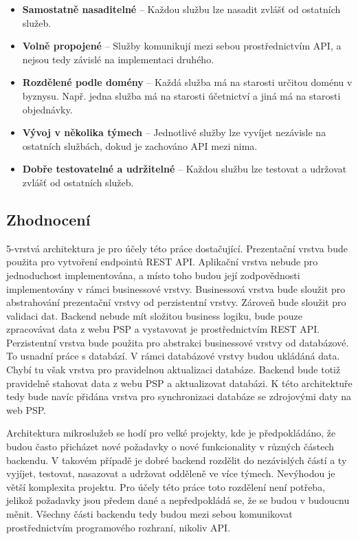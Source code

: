 \begin{itemize}
	\item \textbf{Samostatně nasaditelné} -- Každou službu lze nasadit zvlášť od ostatních služeb.

	\item \textbf{Volně propojené} -- Služby komunikují mezi sebou prostřednictvím API, a nejsou tedy závislé na implementaci druhého.
	
	\item \textbf{Rozdělené podle domény} -- Každá služba má na starosti určitou doménu v byznysu. \linebreak Např. jedna služba má na starosti účetnictví a jiná má na starosti objednávky.
	
	\item \textbf{Vývoj v několika týmech} -- Jednotlivé služby lze vyvíjet nezávisle na ostatních \linebreak službách, dokud je zachováno API mezi nima.
	
	\item \textbf{Dobře testovatelné a udržitelné} -- Každou službu lze testovat a udržovat zvlášť od ostatních služeb.
\end{itemize}

\subsection{Zhodnocení}
5-vrstvá architektura je pro účely této práce dostačující. Prezentační vrstva bude použita pro vytvoření endpointů REST API. Aplikační vrstva nebude pro jednoduchost \linebreak implementována, a místo toho budou její zodpovědnosti implementovány v rámci businessové vrstvy. Businessová vrstva bude sloužit pro abstrahování prezentační vrstvy od perzistentní vrstvy. Zároveň bude sloužit pro validaci dat. Backend nebude mít složitou business \linebreak logiku, bude pouze zpracovávat data z webu PSP a vystavovat je prostřednictvím REST API. Perzistentní vrstva bude použita pro abstrakci businessové vrstvy od databázové. To usnadní práce s databází. V rámci databázové vrstvy budou ukládáná data. Chybí tu však vrstva pro pravidelnou aktualizaci databáze. Backend bude totiž pravidelně stahovat data z webu PSP \linebreak a aktualizovat databázi. K této architektuře tedy bude navíc přidána vrstva pro synchronizaci databáze se zdrojovými daty na web PSP.

Architektura mikroslužeb se hodí pro velké projekty, kde je předpokládáno, že budou často přicházet nové požadavky o nové funkcionality v různých částech backendu. V takovém případě je dobré backend rozdělit do nezávislých částí a ty vyjíjet, testovat, nasazovat a udržovat odděleně ve více týmech. Nevýhodou je větší komplexita projektu. Pro účely této práce toto rozdělení není potřeba, jelikož požadavky jsou předem dané a nepředpokládá se, že se budou \linebreak v budoucnu měnit. Všechny části backendu tedy budou mezi sebou komunikovat prostřednictvím programového rozhraní, nikoliv API.


